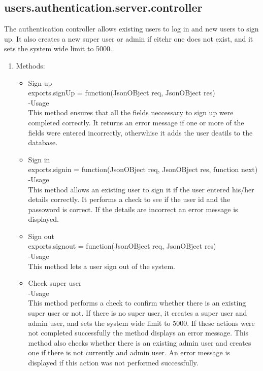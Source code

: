 \documentclass[a4paper,12pt]{article}
\begin{document}
\subsection{users.authentication.server.controller}
 The authentication controller allows existing users to log in and new users to sign up. It also creates a new super user or admin if eitehr one does not exist, and it sets the system wide limit to 5000.
\begin{enumerate}
\item Methods:
	\begin{itemize}
	\item Sign up\\
  	exports.signUp = function(JsonOBject req, JsonOBject res)\\
  	-Usage\\
  	This method ensures that all the fields neccessary to sign up were completed correctly. It returns an error message if one or 	more of the fields were entered incorrectly, otherwhise it adds the user deatils to the database.
 	 \item Sign in\\
	exports.signin = function(JsonOBject req, JsonOBject res, function next) \\
	-Usage\\
	This method allows an existing user to sign it if the user entered his/her details correctly. It performs a check to see if the user 	id and the passoword is correct. If the details are incorrect an error message is displayed.
	\item Sign out\\
	exports.signout = function(JsonOBject req, JsonOBject res)\\
	-Usage\\
	This method lets a user sign out of the system.
 	 \item Check super user\\
 	 -Usage\\
  This method performs a check to confirm whether there is an existing super user or not. If there is no super user, it creates a super user and admin user, and sets the system wide limit to 5000. If these actions were not completed successfully the method displays an error message. This method also checks whether there is an existing admin user and creates one if there is not currently and admin user. An error message is displayed if this action was not performed successfully.
	\end{itemize}
\end{enumerate}
\end{document}
